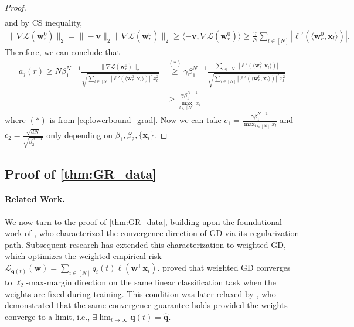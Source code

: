 \documentclass{article} %
\theoremstyle{plain}
\theoremstyle{definition}
\theoremstyle{remark}
\newcommand{\Ls}{\mathcal{L}}
\def\bx{{\mathbf x}}
\def\bw{{\mathbf w}}
\def\bv{{\mathbf v}}
\begin{document}
\begin{proof}
\begin{align*}
    \end{align*}
    and by CS inequality,
    \begin{align}\label{eq:lowerbound_grad}
        \|\nabla\Ls(\bw_r^0)\|_2=\|-\bv\|_2\|\nabla\Ls(\bw_r^0)\|_2 \geq \langle -\bv, \nabla\Ls(\bw_r^0) \rangle \geq \frac{\gamma}{N} \sum_{l\in[N]} |\ell'(\langle \bw_r^0, \bx_l \rangle)|.
    \end{align}
    Therefore, we can conclude that
    \begin{align*}
        a_j(r) \geq N\beta_1^{N-1}\frac{\|\nabla\Ls(\bw_r^0)\|_2}{\sqrt{\sum_{l \in [N]}|\ell'(\langle \bw_r^0, \bx_l \rangle)|^2x_l^2}} & \overset{(*)}{\geq} \gamma \beta_1^{N-1}\frac{\sum_{l\in[N]} |\ell'(\langle \bw_r^0, \bx_l \rangle)|}{\sqrt{\sum_{l \in [N]}|\ell'(\langle \bw_r^0, \bx_l \rangle)|^2x_l^2}} \\
        &\geq \frac{\gamma \beta_1^{N-1}}{\max_{l \in [N]}x_l}
    \end{align*}
    where $(*)$ is from \cref{eq:lowerbound_grad}. Now we can take $c_1 = \frac{\gamma \beta_1^{N-1}}{\max_{l \in [N]}x_l}$ and $c_2 = \frac{\sqrt{dN}}{\sqrt{\beta_2^{N-1}}}$ only depending on $\beta_1, \beta_2, \{\bx_i\}$.
\end{proof}

\subsection[Proof of Theorem \ref{thm:GR_data}]{Proof of \cref{thm:GR_data}} \label{subsec:GR_data}

\paragraph{Related Work.}
We now turn to the proof of \cref{thm:GR_data}, building upon the foundational work of \citet{ji2020regularization}, who characterized the convergence direction of GD via its regularization path. Subsequent research has extended this characterization to weighted GD, which optimizes the weighted empirical risk $\Ls_{\mathbf{q}(t)}(\bw) = \sum_{i \in [N]} q_i(t)\ell(\bw^\top \bx_i)$. \citet{xu2021understanding} proved that weighted GD converges to $\ell_2$-max-margin direction on the same linear classification task when the weights are fixed during training. This condition was later relaxed by \citet{zhai2023understanding}, who demonstrated that the same convergence guarantee holds provided the weights converge to a limit, i.e., $\exists \lim_{t \rightarrow \infty} \mathbf{q}(t) = \hat{\mathbf{q}}$.
\end{document}
